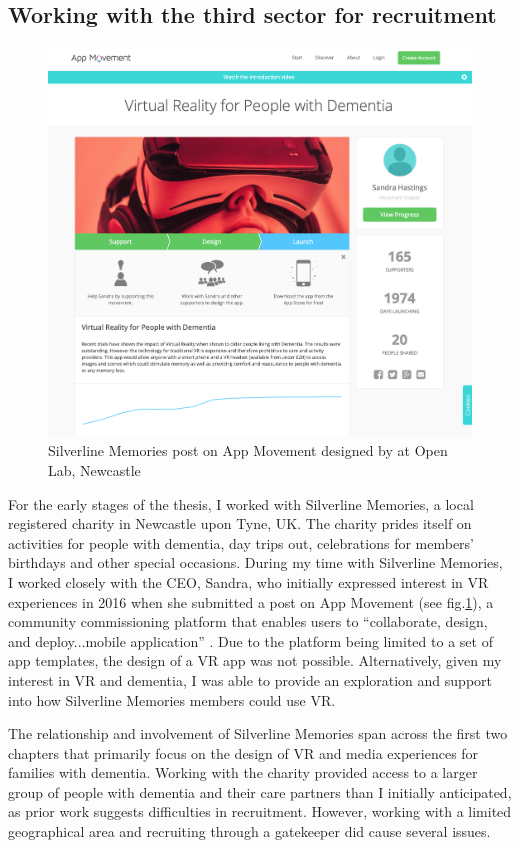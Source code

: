 \subsection{Working with the third sector for recruitment}
\label{Method:ThirdSector}
\begin{figure}[htp]
    \centering
    \includegraphics[width=0.6\linewidth]{Images/Methodology/AppMovement-SilverlineMemories.png}
    \caption{Silverline Memories post on App Movement designed by  \cite{garbett_app_2016} at Open Lab, Newcastle}
    \label{fig:AppMovement-Sandra}
\end{figure}

For the early stages of the thesis, I worked with Silverline Memories, a local registered charity in Newcastle upon Tyne, UK. The charity prides itself on activities for people with dementia, day trips out, celebrations for members' birthdays and other special occasions. During my time with Silverline Memories, I worked closely with the CEO, Sandra, who initially expressed interest in VR experiences in 2016 when she submitted a post on App Movement (see fig.\ref{fig:AppMovement-Sandra}), a community commissioning platform that enables users to ``collaborate, design, and deploy...mobile application'' \citep{garbett_app_2016}. Due to the platform being limited to a set of app templates, the design of a VR app was not possible. Alternatively, given my interest in VR and dementia, I was able to provide an exploration and support into how Silverline Memories members could use VR. 

The relationship and involvement of Silverline Memories span across the first two chapters that primarily focus on the design of VR and media experiences for families with dementia. Working with the charity provided access to a larger group of people with dementia and their care partners than I initially anticipated, as prior work suggests difficulties in recruitment. However, working with a limited geographical area and recruiting through a gatekeeper did cause several issues. 

